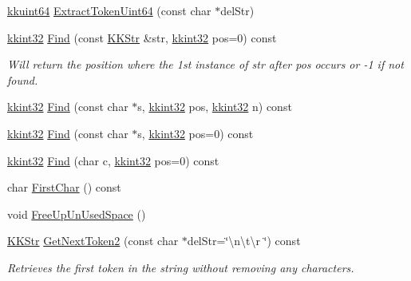 \begin{DoxyCompactItemize}
\item 
\hyperlink{namespace_k_k_b_a1f2b0568d3b63cc7697dcff73250113e}{kkuint64} \hyperlink{class_k_k_b_1_1_k_k_str_a8d0da474b5f5c2bea4f334dd7f481f02}{Extract\+Token\+Uint64} (const char $\ast$del\+Str)
\item 
\hyperlink{namespace_k_k_b_a8fa4952cc84fda1de4bec1fbdd8d5b1b}{kkint32} \hyperlink{class_k_k_b_1_1_k_k_str_a3972260712f99de712591dc5be2d3eef}{Find} (const \hyperlink{class_k_k_b_1_1_k_k_str}{K\+K\+Str} \&str, \hyperlink{namespace_k_k_b_a8fa4952cc84fda1de4bec1fbdd8d5b1b}{kkint32} pos=0) const 
\begin{DoxyCompactList}\small\item\em Will return the position where the 1st instance of \textquotesingle{}str\textquotesingle{} after \textquotesingle{}pos\textquotesingle{} occurs or -\/1 if not found. \end{DoxyCompactList}\item 
\hyperlink{namespace_k_k_b_a8fa4952cc84fda1de4bec1fbdd8d5b1b}{kkint32} \hyperlink{class_k_k_b_1_1_k_k_str_a7a487bfc4e1026b48d2420a51d73e188}{Find} (const char $\ast$s, \hyperlink{namespace_k_k_b_a8fa4952cc84fda1de4bec1fbdd8d5b1b}{kkint32} pos, \hyperlink{namespace_k_k_b_a8fa4952cc84fda1de4bec1fbdd8d5b1b}{kkint32} n) const 
\item 
\hyperlink{namespace_k_k_b_a8fa4952cc84fda1de4bec1fbdd8d5b1b}{kkint32} \hyperlink{class_k_k_b_1_1_k_k_str_a87040cbebd1e99132c71a3b214e1ae8d}{Find} (const char $\ast$s, \hyperlink{namespace_k_k_b_a8fa4952cc84fda1de4bec1fbdd8d5b1b}{kkint32} pos=0) const 
\item 
\hyperlink{namespace_k_k_b_a8fa4952cc84fda1de4bec1fbdd8d5b1b}{kkint32} \hyperlink{class_k_k_b_1_1_k_k_str_a3f7b44ee6b031925985f70afbcbfb043}{Find} (char c, \hyperlink{namespace_k_k_b_a8fa4952cc84fda1de4bec1fbdd8d5b1b}{kkint32} pos=0) const 
\item 
char \hyperlink{class_k_k_b_1_1_k_k_str_ac20e69c629b985c6569af914d9cc3e8c}{First\+Char} () const 
\item 
void \hyperlink{class_k_k_b_1_1_k_k_str_a1433a961b356aed247aa9b7a6ee2915c}{Free\+Up\+Un\+Used\+Space} ()
\item 
\hyperlink{class_k_k_b_1_1_k_k_str}{K\+K\+Str} \hyperlink{class_k_k_b_1_1_k_k_str_ab296d5e58bf9c27be53210b0cf44ad43}{Get\+Next\+Token2} (const char $\ast$del\+Str=\char`\"{}\textbackslash{}n\textbackslash{}t\textbackslash{}r \char`\"{}) const 
\begin{DoxyCompactList}\small\item\em Retrieves the first token in the string without removing any characters. \end{DoxyCompactList}\item 

\end{DoxyCompactItemize}
